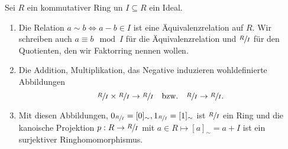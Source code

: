 \begin{theorem}
Sei $R$ ein kommutativer Ring un $I \subseteq R$ ein Ideal.
\begin{enumerate}
	\item Die Relation $a \sim b \Leftrightarrow a - b \in I$ ist eine Äquivalenzrelation auf $R$.
		Wir schreiben auch $a \equiv b \mod I$ für die Äquivalenzrelation und $\sfrac{R}{I}$ für den Quotienten, den wir Faktorring nennen wollen.
	\item Die Addition, Multiplikation, das Negative induzieren wohldefinierte Abbildungen
		\[
			\sfrac{R}{I} \times \sfrac{R}{I} \to \sfrac{R}{I} \qq{bzw.} \sfrac{R}{I} \to \sfrac{R}{I}
		.\] 
	\item Mit diesen Abbildungen, $0_{\sfrac{R}{I}} = [0]_{\sim}, 1_{\sfrac{R}{I}} = [1]_{\sim}$ ist $\sfrac{R}{I}$ ein Ring und die kanoische Projektion
		$p: R \to \sfrac{R}{I}$ mit $a \in R \mapsto [a]_{\sim} = a + I$ ist ein surjektiver Ringhomomorphismus.
\end{enumerate}
\end{theorem}

